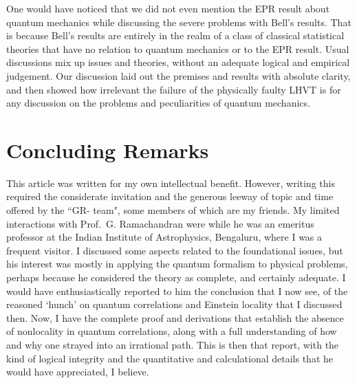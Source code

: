 One would have noticed that we did not even mention the EPR result about quantum
mechanics while discussing the severe problems with Bell's results. That is because Bell's
results are entirely in the realm of a class of classical statistical theories that have no relation
to quantum mechanics or to the EPR result. Usual discussions mix up issues and theories,
without an adequate logical and empirical judgement. Our discussion laid out the premises
and results with absolute clarity, and then showed how irrelevant the failure of the physically
faulty LHVT is for any discussion on the problems and peculiarities of quantum mechanics.

\section{Concluding Remarks}\label{c14-sec10}

This article was written for my own intellectual benefit. However, writing this required
the considerate invitation and the generous leeway of topic and time offered by the ``GR-
team", some members of which are my friends. My limited interactions with Prof.\ G.
Ramachandran were while he was an emeritus professor at the Indian Institute of Astrophysics, Bengaluru, where I was a frequent visitor. I discussed some aspects related to the
foundational issues, but his interest was mostly in applying the quantum formalism to physical problems, perhaps because he considered the theory as complete, and certainly adequate. I would have enthusiastically reported to him the conclusion that I now see, of the reasoned
`hunch' on quantum correlations and Einstein locality that I discussed then. Now, I have
the complete proof and derivations that establish the absence of nonlocality in quantum
correlations, along with a full understanding of how and why one strayed into an irrational
path. This is then that report, with the kind of logical integrity and the quantitative and
calculational details that he would have appreciated, I believe.

